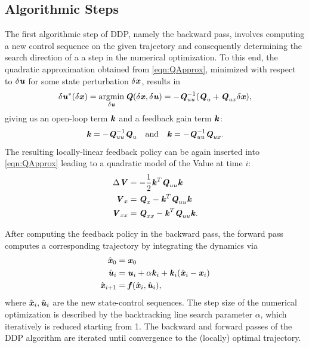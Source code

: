 \subsection{Algorithmic Steps}
The first algorithmic step of \gls{DDP}, namely the backward pass, involves computing a new control sequence on the given trajectory and consequently determining the search direction of a a step in the numerical optimization. To this end, the quadratic approximation obtained from \cref{eqn:QApprox}, minimized with respect to $\delta\bm{\mathit{u}}$ for some state perturbation $\delta\bm{\mathit{x}}$, results in
\begin{equation*}
\delta\bm{\mathit{u}}^*(\delta\bm{\mathit{x}})=\operatorname*{argmin}_{\delta\bm{\mathit{u}}}\bm{\mathit{Q}}(\delta\bm{\mathit{x}},\delta\bm{\mathit{u}})=-\bm{\mathit{Q}}_{uu}^{-1}(\bm{\mathit{Q}}_{u}+\bm{\mathit{Q}}_{ux}\delta\bm{\mathit{x}}),
\end{equation*}
giving us an open-loop term $\bm{\mathit{k}}$ and a feedback gain term $\bm{\mathit{k}}$:
\begin{equation*}
\bm{\mathit{k}}=-\bm{\mathit{Q}}_{uu}^{-1}\bm{\mathit{Q}}_{u}\quad \text{and} \quad \bm{\mathit{k}}=-\bm{\mathit{Q}}_{uu}^{-1}\bm{\mathit{Q}}_{ux}.
\end{equation*}
The resulting locally-linear feedback policy can be again inserted into \cref{eqn:QApprox} leading to a quadratic model of the Value at time $i$: 
\begin{align*}
 \Delta \bm{\mathit{V}} &= -\dfrac{1}{2}\bm{\mathit{k}}^T\bm{\mathit{Q}}_{uu}\bm{\mathit{k}} \\
 \bm{\mathit{V}}_{x} &= \bm{\mathit{Q}}_{x}-\bm{\mathit{k}}^T\bm{\mathit{Q}}_{uu}\bm{\mathit{k}} \\
 \bm{\mathit{V}}_{xx} &= \bm{\mathit{Q}}_{xx}-\bm{\mathit{k}}^T\bm{\mathit{Q}}_{uu}\bm{\mathit{k}}.
\end{align*}

After computing the feedback policy in the backward pass, the forward pass computes a corresponding trajectory by integrating the dynamics via
\begin{align*}
\hat{\bm{\mathit{x}}}_0 		&=\bm{\mathit{x}}_0 \\
\hat{\bm{\mathit{u}}}_i 		&=\bm{\mathit{u}}_i+\alpha\bm{\mathit{k}}_i+\bm{\mathit{k}}_i(\hat{\bm{\mathit{x}}}_i-\bm{\mathit{x}}_i) \\
\hat{\bm{\mathit{x}}}_{i+1}	&=\bm{\mathit{f}}(\hat{\bm{\mathit{x}}}_i,\hat{\bm{\mathit{u}}}_i),
\end{align*}
where $\hat{\bm{\mathit{x}}}_i,\hat{\bm{\mathit{u}}}_i$ are the new state-control sequences. The step size of the numerical optimization is described by the backtracking line search parameter $\alpha$, which iteratively is reduced starting from 1. The backward and forward passes of the \gls{DDP} algorithm are iterated until convergence to the (locally) optimal trajectory.  

